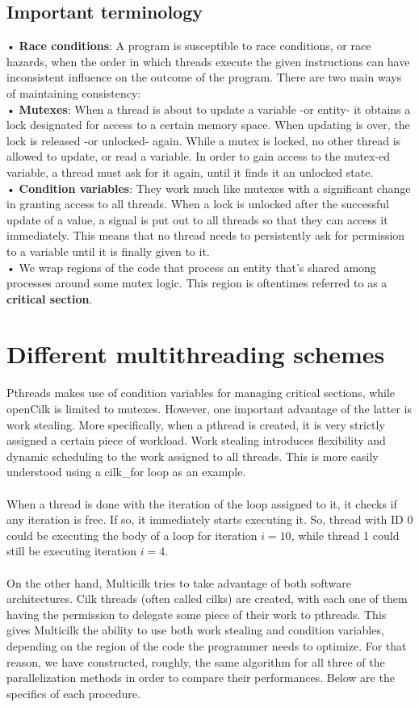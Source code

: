 \documentclass[11pt,a4paper,onecolumn,final]{article}
\begin{document}
\subsection{Important terminology}
• \textbf{Race conditions}: A program is susceptible to race conditions, or race hazards, when the order in which threads execute the given instructions can have inconsistent influence on the outcome of the program.
There are two main ways of maintaining consistency:\\
• \textbf{Mutexes}: When a thread is about to update a variable -or entity- it obtains a lock designated for access to a certain memory space. When updating is over, the lock is released -or unlocked- again. While a mutex is locked, no other thread is allowed to update, or read a variable. In order to gain access to the mutex-ed variable, a thread must ask for it again, until it finds it an unlocked state.\\
• \textbf{Condition variables}: They work much like mutexes with a significant change in granting access to all threads. When a lock is unlocked after the successful update of a value, a signal is put out to all threads so that they can access it immediately. This means that no thread needs to persistently ask for permission to a variable until it is finally given to it.\\
• We wrap regions of the code that process an entity that’s shared among processes around some mutex logic. This region is oftentimes referred to as a \textbf{critical section}.
\section{Different multithreading schemes}
Pthreads makes use of condition variables for managing critical sections, while openCilk is limited to mutexes. However, one important advantage of the latter is work stealing. More specifically, when a pthread is created, it is very strictly assigned a certain piece of workload. Work stealing introduces flexibility and dynamic scheduling to the work assigned to all threads. This is more easily understood using a cilk\_for loop as an example.\\
\\
When a thread is done with the iteration of the loop assigned to it, it checks if any iteration is free. If so, it immediately starts executing it. So, thread with ID 0 could be executing the body of a loop for iteration $i=10$, while thread 1 could still be executing iteration $i=4$.\\
\\
On the other hand, Multicilk tries to take advantage of both software architectures. Cilk threads (often called cilks) are created, with each one of them having the permission to delegate some piece of their work to pthreads. This gives Multicilk the ability to use both work stealing and condition variables, depending on the region of the code the programmer needs to optimize. For that reason, we have constructed, roughly, the same algorithm for all three of the parallelization methods in order to compare their performances. Below are the specifics of each procedure.
\end{document}
